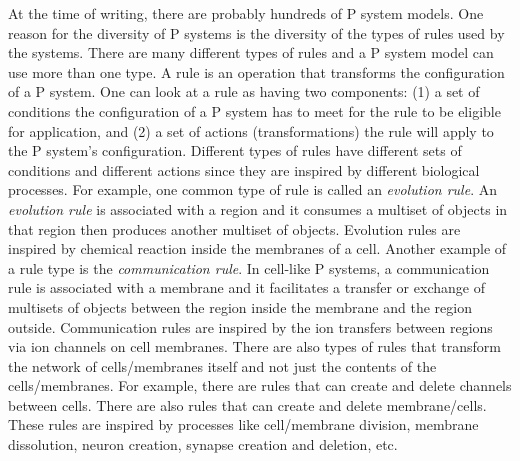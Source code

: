 \documentclass[12pt,A4]{article}
\begin{document}
At the time of writing, there are probably hundreds of P system models. One reason for the
diversity of P systems is the diversity of the types of rules used by the systems. There are many
different types of rules and a P system model can use more than one type.  A rule is an 
operation that transforms the configuration of a P system. One can look at a rule as having two
components: (1) a set of conditions the configuration of a P system has to meet for the rule to
be eligible for application, and (2) a set of actions (transformations) the rule will apply to
the P system's configuration. Different types of rules have different sets of conditions and
different actions since they are inspired by different biological processes. For example, one common
type of rule is called an \emph{evolution rule}. An \emph{evolution rule} is associated with a
region and it consumes a multiset of objects in that region then produces another multiset of 
objects. Evolution rules are inspired by chemical reaction inside the membranes of a cell. Another
example of a rule type is the \emph{communication rule}. In cell-like P systems, a communication
rule is associated with a membrane and it facilitates a transfer or exchange of multisets of objects
between the region inside the membrane and the region outside. Communication rules are inspired by
the ion transfers between regions via ion channels on cell membranes. There are also types of rules
that transform the network of cells/membranes itself and not just the contents of the 
cells/membranes. For example, there are rules that can create and delete channels between cells. 
There are also rules that can create and delete membrane/cells. These rules are inspired by processes
like cell/membrane division, membrane dissolution, neuron creation, synapse creation and deletion, 
etc.
\end{document}
